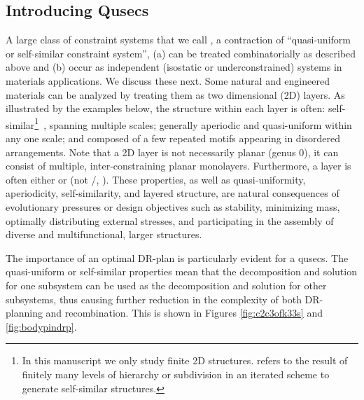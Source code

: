 \subsection{Introducing Qusecs}
A large class of constraint systems that we call , a contraction of ``quasi-uniform or self-similar constraint system'', (a) can be treated combinatorially as described above and (b) occur as independent (isostatic or underconstrained) systems in materials applications. We discuss these next.
%
Some natural and engineered materials can be analyzed by treating them as two dimensional (2D) layers. As illustrated by the examples below, the structure within each layer is often: self-similar\footnote{In this manuscript we only study finite 2D structures.  refers to the result of finitely many levels of hierarchy or subdivision in an iterated scheme to generate self-similar structures.}~\cite{2012arXiv1204.6389G}, spanning multiple scales; generally aperiodic and quasi-uniform within any one scale; and composed of a few repeated motifs appearing in disordered arrangements.
Note that a 2D layer is not necessarily planar (genus 0), it can consist of multiple, inter-constraining planar monolayers. Furthermore, a layer is often  either  or  (not /, \seedefsd). These properties, as well as quasi-uniformity, aperiodicity, self-similarity, and layered structure, are natural consequences of evolutionary pressures or design objectives such as stability, minimizing mass, optimally distributing external stresses, and participating in the assembly of diverse and multifunctional, larger structures.
%

The importance of an optimal DR-plan is particularly evident for a qusecs. The quasi-uniform or self-similar properties mean that the decomposition and solution for one subsystem can be used as the decomposition and solution for other subsystems, thus causing further reduction in the complexity of both DR-planning and recombination. This is shown in Figures \ref{fig:c2c3ofk33s} and \ref{fig:bodypindrp}.




